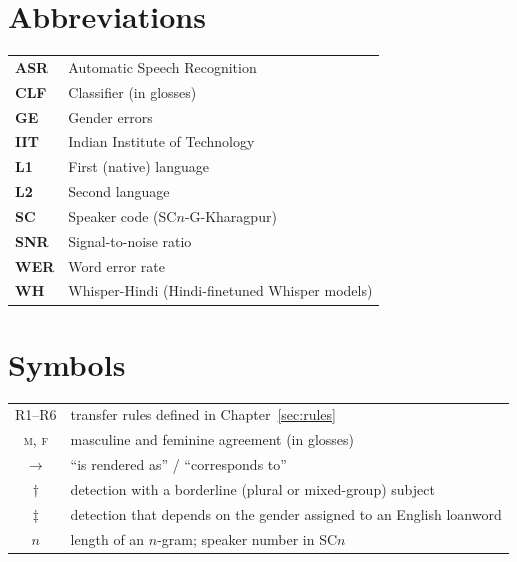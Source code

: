 \documentclass[11pt,a4paper]{report}
\begin{document}
\clearpage
{}
{}
\chapter*{Abbreviations}
\singlespacing
\begin{center}
\begin{tabular}{@{}ll@{}}
\textbf{ASR}  & Automatic Speech Recognition \\[3pt]
\textbf{CLF}  & Classifier (in glosses) \\[3pt]
\textbf{GE}   & Gender errors \\[3pt]
\textbf{IIT}  & Indian Institute of Technology \\[3pt]
\textbf{L1}   & First (native) language \\[3pt]
\textbf{L2}   & Second language \\[3pt]
\textbf{SC}   & Speaker code (SC$n$-G-Kharagpur) \\[3pt]
\textbf{SNR}  & Signal-to-noise ratio \\[3pt]
\textbf{WER}  & Word error rate \\[3pt]
\textbf{WH}   & Whisper-Hindi (Hindi-finetuned Whisper models) \\
\end{tabular}
\end{center}

\clearpage
{}
{}
\chapter*{Symbols}
\singlespacing
\begin{center}
\begin{tabular}{@{}cl@{}}
R1--R6 & transfer rules defined in Chapter~\ref{sec:rules} \\[3pt]
\textsc{m}, \textsc{f} & masculine and feminine agreement (in glosses) \\[3pt]
$\to$ & ``is rendered as'' / ``corresponds to'' \\[3pt]
$\dagger$ & detection with a borderline (plural or mixed-group) subject \\[3pt]
$\ddagger$ & detection that depends on the gender assigned to an English loanword \\[3pt]
$n$ & length of an $n$-gram; speaker number in SC$n$ \\
\end{tabular}
\end{center}
\end{document}
